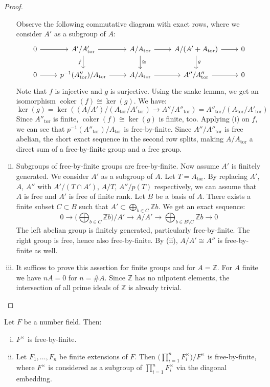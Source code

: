 \begin{proof}
\begin{enumerate}[(i)]
Observe the following commutative diagram with exact rows, where we consider $A'$ as a subgroup of $A$:
\[ \begin{tikzcd}
0 \ar[r]& A'/A'_\text{tor}\ar[r]\ar[d, "f"'] & A/A_\text{tor}\ar[r]\ar[d, "\cong"] & A/(A'+A_\text{tor}) \ar[r]\ar[d, "g"]& 0\\
0 \ar[r] & p^{-1}(A''_\text{tor})/A_\text{tor} \ar[r]& A/A_\text{tor}\ar[r] & A''/A''_\text{tor}\ar[r] & 0
\end{tikzcd} \]
Note that $f$ is injective and $g$ is surjective. Using the snake lemma, we get an isomorphism $\operatorname{coker}(f)\cong \ker(g)$. We have:
\[\ker(g) = \ker( (A/A')/(A_\text{tor}/A'_\text{tor}) \to A''/A''_\text{tor} ) = A''_\text{tor}/(A_\text{tor}/A'_\text{tor})\]
Since $A''_\text{tor}$ is finite, $\operatorname{coker}(f)\cong \ker(g)$ is finite, too. Applying (i) on $f$, we can see that $p^{-1}(A''_\text{tor})/A_\text{tor}$ is free-by-finite. Since $A''/A''_\text{tor}$ is free abelian, the short exact sequence in the second row splits, making $A/A_\text{tor}$ a direct sum of a free-by-finite group and a free group.
\item Subgroups of free-by-finite groups are free-by-finite. Now assume $A'$ is finitely generated. We consider $A'$ as a subgroup of $A$. Let $T=A_\text{tor}$. By replacing $A'$, $A$, $A''$ with $A'/(T\cap A')$, $A/T$, $A''/p(T)$ respectively, we can assume that $A$ is free and $A'$ is free of finite rank. Let $B$ be a basis of $A$. There exists a finite subset $C\subset B$ such that $A'\subset \bigoplus_{b\in C}\mathbb{Z}b$. We get an exact sequence:
\[ 0 \longrightarrow \Big(\bigoplus_{b\in C} \mathbb{Z}b\Big)\Big/A' \longrightarrow A/A' \longrightarrow \bigoplus_{b\in B\setminus C}\mathbb{Z}b \longrightarrow 0 \]
The left abelian group is finitely generated, particularly free-by-finite. The right group is free, hence also free-by-finite. By (ii), $A/A'\cong A''$ is free-by-finite as well.
\item It suffices to prove this assertion for finite groups and for $A=\mathbb{Z}$. For $A$ finite we have $nA = 0$ for $n = \#A$. Since $\mathbb{Z}$ has no nilpotent elements, the intersection of all prime ideals of $\mathbb{Z}$ is already trivial. \qedhere
\end{enumerate}
\end{proof}

\begin{lemma}\label{5.3}
Let $F$ be a number field. Then:
\begin{enumerate}[(i)]
\item $F^\times$ is free-by-finite.
\item Let $F_1,\ldots,F_n$ be finite extensions of $F$. Then $\big(\prod_{i=1}^{n}F_i^\times\big)/F^\times$ is free-by-finite, where $F^\times$ is considered as a subgroup of $\prod_{i=1}^{n}F_i^\times$ via the diagonal embedding.
\end{enumerate}
\end{lemma}

